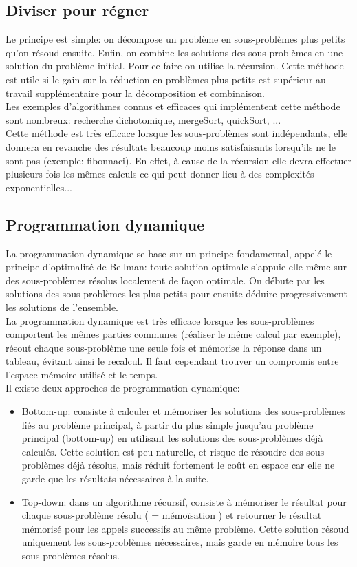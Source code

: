 \subsection{Diviser pour régner}
Le principe est simple: on décompose un problème en sous-problèmes plus petits qu'on résoud ensuite. Enfin, on combine les solutions des sous-problèmes en une solution du problème initial. Pour ce faire on utilise la récursion. Cette méthode est utile	si le gain sur la réduction	en problèmes plus petits est supérieur au travail supplémentaire pour la décomposition et combinaison. \\
Les exemples d'algorithmes connus et efficaces qui implémentent cette méthode sont nombreux: recherche dichotomique, mergeSort, quickSort, ... \\
Cette méthode est très efficace lorsque les sous-problèmes sont indépendants, elle donnera en revanche des résultats beaucoup moins satisfaisants lorsqu'ils ne le sont pas (exemple: fibonnaci). En effet, à cause de la récursion elle devra effectuer plusieurs fois les mêmes calculs ce qui peut donner lieu à des complexités exponentielles...


\subsection{Programmation dynamique}
La programmation dynamique se base sur un principe fondamental, appelé le principe d'optimalité de Bellman: toute solution optimale s'appuie elle-même sur des sous-problèmes résolus localement de façon optimale. On débute par les solutions des sous-problèmes les plus petits pour ensuite déduire progressivement les solutions de l'ensemble. \\
La programmation dynamique est très efficace lorsque les sous-problèmes comportent les mêmes parties communes (réaliser le même calcul par exemple), résout chaque sous-problème une seule fois et mémorise la réponse dans un tableau, évitant ainsi le recalcul. Il faut cependant trouver un compromis entre l'espace mémoire utilisé et le temps. \\
Il existe deux approches de programmation dynamique: 
\begin{itemize}
	\item Bottom-up: consiste à calculer et mémoriser les solutions des sous-problèmes liés au problème principal, à partir du plus simple jusqu'au problème principal (bottom-up) en utilisant les solutions des sous-problèmes déjà calculés. Cette solution est peu naturelle, et risque de résoudre des sous-problèmes déjà résolus, mais réduit fortement le coût en espace car elle ne garde que les résultats nécessaires à la suite.
	\item Top-down: dans un algorithme récursif, consiste à mémoriser le résultat pour chaque sous-problème résolu ( = mémoïsation ) et retourner le résultat mémorisé pour les appels successifs au même problème. Cette solution résoud uniquement les sous-problèmes nécessaires, mais garde en mémoire tous les sous-problèmes résolus.
\end{itemize} 